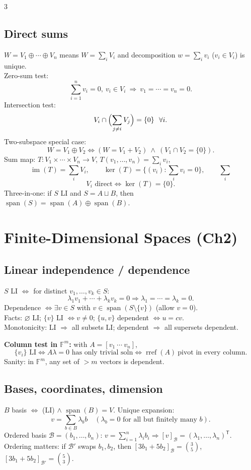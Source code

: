 \documentclass[9pt]{article}
\newcommand{\F}{\mathbb{F}}
\newcommand{\Ker}{\operatorname{ker}}
\newcommand{\im}{\operatorname{im}}
\newcommand{\spann}{\operatorname{span}}
\begin{document}
\begin{multicols}{3}
\subsection*{Direct sums}
$W=V_1\oplus\cdots\oplus V_n$ means $W=\sum_i V_i$ and decomposition $w=\sum_i v_i$ ($v_i\in V_i$) is unique.\\
Zero-sum test:
\[
\sum_{i=1}^n v_i=0,\ v_i\in V_i\ \Rightarrow\ v_1=\cdots=v_n=0.
\]
Intersection test:
\[
V_i\cap\Bigl(\sum_{j\neq i}V_j\Bigr)=\{0\}\ \ \forall i.
\]
Two-subspace special case:
\[
W=V_1\oplus V_2 \iff (W=V_1+V_2)\ \wedge\ (V_1\cap V_2=\{0\}).
\]
Sum map: $T:V_1\times\cdots\times V_n\to V$, $T(v_1,\dots,v_n)=\sum_i v_i$,
\[
\im(T)=\sum_i V_i,\qquad \Ker(T)=\{(v_i):\sum_i v_i=0\},\qquad \sum_i 
\]
\[
V_i\text{ direct}\iff \Ker(T)=\{0\}.
\]
Three-in-one: if $S$ LI and $S=A\sqcup B$, then $\spann(S)=\spann(A)\oplus\spann(B)$.

\section*{Finite-Dimensional Spaces (Ch2)}

\subsection*{Linear independence / dependence}
$S$ LI $\iff$ for distinct $v_1,\dots,v_k\in S$:
\[
\lambda_1v_1+\cdots+\lambda_kv_k=0\Rightarrow \lambda_1=\cdots=\lambda_k=0.
\]
Dependence $\iff \exists v\in S$ with $v\in\spann(S\setminus\{v\})$ (allow $v=0$).\\
Facts: $\varnothing$ LI; $\{v\}$ LI $\iff v\neq 0$; $\{u,v\}$ dependent $\iff u=cv$.\\
Monotonicity: LI $\Rightarrow$ all subsets LI; dependent $\Rightarrow$ all supersets dependent.

\textbf{Column test in $\F^m$:} with $A=[v_1\ \cdots\ v_n]$,
\[
\{v_i\}\text{ LI}\iff A\lambda=0 \text{ has only trivial soln}\iff \operatorname{rref}(A)\ \text{pivot in every column}.
\]
Sanity: in $\F^m$, any set of $>m$ vectors is dependent.

\subsection*{Bases, coordinates, dimension}
$B$ basis $\iff$ (LI) $\wedge$ $\spann(B)=V$. Unique expansion:
\[
v=\sum_{b\in B}\lambda_b b\quad(\lambda_b=0\text{ for all but finitely many }b).
\]
Ordered basis $\mathcal{B}=(b_1,\dots,b_n)$: $v=\sum_{i=1}^n\lambda_i b_i\Rightarrow [v]_{\mathcal{B}}=(\lambda_1,\dots,\lambda_n)^{\mathsf T}$.\\
Ordering matters: if $\mathcal{B}'$ swaps $b_1,b_2$, then $[3b_1+5b_2]_{\mathcal{B}}=\binom{3}{5}$, $[3b_1+5b_2]_{\mathcal{B}'}=\binom{5}{3}$.


\end{multicols}
\end{document}
